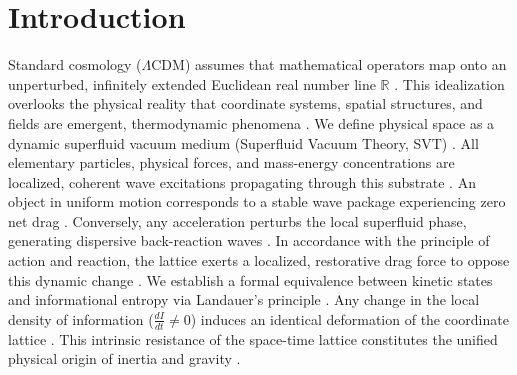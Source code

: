 \documentclass[twocolumn]{aa}
\begin{document}

\maketitle

\section{Introduction}
Standard cosmology ($\Lambda$CDM) assumes that mathematical operators map onto an unperturbed, infinitely extended Euclidean real number line $\mathbb{R}$ \cite{einstein1917}. This idealization overlooks the physical reality that coordinate systems, spatial structures, and fields are emergent, thermodynamic phenomena \cite{einstein1917, riemann1857}. We define physical space as a dynamic superfluid vacuum medium (Superfluid Vacuum Theory, SVT) \cite{volovik2003}. All elementary particles, physical forces, and mass-energy concentrations are localized, coherent wave excitations propagating through this substrate \cite{volovik2003}. An object in uniform motion corresponds to a stable wave package experiencing zero net drag \cite{volovik2003}. Conversely, any acceleration perturbs the local superfluid phase, generating dispersive back-reaction waves \cite{volovik2003}. In accordance with the principle of action and reaction, the lattice exerts a localized, restorative drag force to oppose this dynamic change \cite{einstein1917}. We establish a formal equivalence between kinetic states and informational entropy via Landauer's principle \cite{landauer1961}. Any change in the local density of information ($\frac{dI}{dt} \neq 0$) induces an identical deformation of the coordinate lattice \cite{landauer1961, bekenstein1981}. This intrinsic resistance of the space-time lattice constitutes the unified physical origin of inertia and gravity \cite{verlinde2011}.

\newpage
\end{document}

